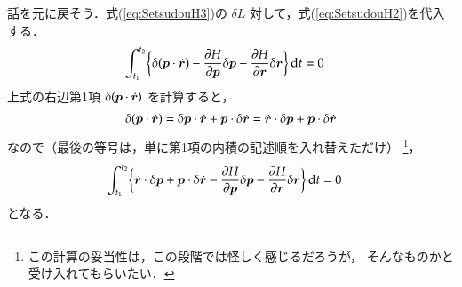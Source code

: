                 話を元に戻そう．式(\ref{eq:SetsudouH3})の $\delta L$ 対して，式(\ref{eq:SetsudouH2})を代入する．
                    \begin{align*}
                        \int_{t_{1}}^{t_{2}} \biggl\{
                                                      \delta(\boldsymbol{p} \cdot \dot{\boldsymbol{r}})
                                                    - \frac{\partial H}{\partial \boldsymbol{p}} \delta \boldsymbol{p}
                                                    - \frac{\partial H}{\partial \boldsymbol{r}} \delta \boldsymbol{r}
                                              \biggr\} \,\mathrm{d} t &= 0
                    \end{align*}
                上式の右辺第1項 $\delta(\boldsymbol{p} \cdot \dot{\boldsymbol{r}})$ を計算すると，
                    \begin{align*}
                        \delta(\boldsymbol{p} \cdot \dot{\boldsymbol{r}}) =   \delta \boldsymbol{p} \cdot \dot{\boldsymbol{r}}
                                                      + \boldsymbol{p} \cdot \delta \dot{\boldsymbol{r}}
                                                    = \dot{\boldsymbol{r}} \cdot \delta \boldsymbol{p}
                                                      + \boldsymbol{p} \cdot \delta \dot{\boldsymbol{r}}
                    \end{align*}
                なので（最後の等号は，単に第1項の内積の記述順を入れ替えただけ）
                    \footnote{
                        この計算の妥当性は，この段階では怪しく感じるだろうが，
                        そんなものかと受け入れてもらいたい．
                    }，
                    \begin{align}\label{SpeedHamiltnian1}
                        \int_{t_{1}}^{t_{2}} \biggl\{
                                                      \dot{\br} \cdot \delta \bp
                                                    + \bp \cdot \delta \dot{\br}
                                                    - \frac{\rd H}{\rd \bp} \delta \bp
                                                    - \frac{\rd H}{\rd \br} \delta \br
                                              \biggr\} \df t &= 0
                    \end{align}
                となる．

